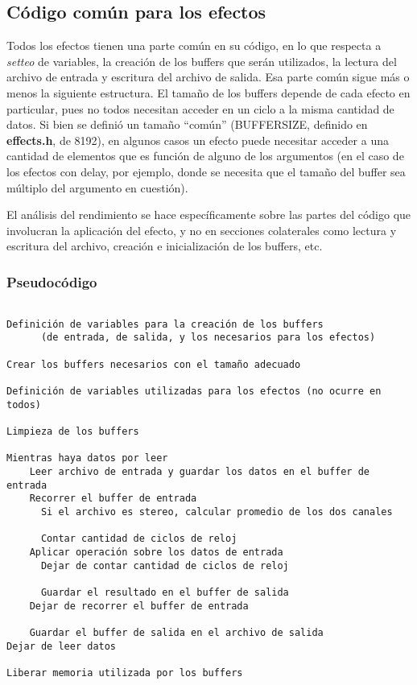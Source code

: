 \subsection{Código común para los efectos}
\label{subsec:desarrollo-comun}

Todos los efectos tienen una parte común en su código, en lo que respecta a \textit{setteo} de variables, la creación de los buffers que serán utilizados, la lectura del archivo de entrada y escritura del archivo de salida. Esa parte común sigue más o menos la siguiente estructura.\vspace{\baselineskip}
El tamaño de los buffers depende de cada efecto en particular, pues no todos necesitan acceder en un ciclo a la misma cantidad de datos. Si bien se definió un tamaño ``común'' (BUFFERSIZE, definido en \textbf{effects.h}, de 8192), en algunos casos un efecto puede necesitar acceder a una cantidad de elementos que es función de alguno de los argumentos (en el caso de los efectos con delay, por ejemplo, donde se necesita que el tamaño del buffer sea múltiplo del argumento en cuestión).

El análisis del rendimiento se hace específicamente sobre las partes del código que involucran la aplicación del efecto, y no en secciones colaterales como lectura y escritura del archivo, creación e inicialización de los buffers, etc. 

\subsubsection{Pseudocódigo}

        
\begin{lstlisting}[frame=single]

Definición de variables para la creación de los buffers
	  (de entrada, de salida, y los necesarios para los efectos)

Crear los buffers necesarios con el tamaño adecuado

Definición de variables utilizadas para los efectos (no ocurre en todos)

Limpieza de los buffers

Mientras haya datos por leer
    Leer archivo de entrada y guardar los datos en el buffer de entrada
    Recorrer el buffer de entrada
      Si el archivo es stereo, calcular promedio de los dos canales
    
      Contar cantidad de ciclos de reloj
	Aplicar operación sobre los datos de entrada
      Dejar de contar cantidad de ciclos de reloj
    
      Guardar el resultado en el buffer de salida
    Dejar de recorrer el buffer de entrada
    
    Guardar el buffer de salida en el archivo de salida
Dejar de leer datos

Liberar memoria utilizada por los buffers
\end{lstlisting}
